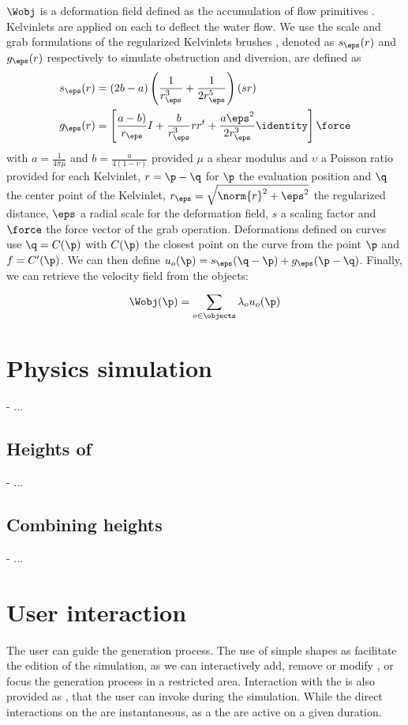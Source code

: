 $\Wobj$ is a deformation field defined as the accumulation of flow primitives \cite{Wejchert1991}. Kelvinlets are applied on each  to deflect the water flow. We use the scale and grab formulations of the regularized Kelvinlets brushes \cite{DeGoes2017}, denoted as $s_\eps(r)$ and $g_\eps(r)$ respectively to simulate obstruction and diversion, are defined as
\begin{align*}
    s_\eps(r) &= (2b - a) \left (\frac{1}{r_\eps^3} + \frac{1}{2r_\eps^5} \right)(s r) \\
    g_\eps(r) &= \left[ \frac{a - b)}{r_\eps}I + \frac{b}{r_\eps^3} r r^t + 
\frac{a \eps^2}{2 r_\eps^3} \identity \right] \force
\end{align*}
with $a = \frac{1}{4 \pi \mu}$ and $b = \frac{a}{4 (1 - \upsilon)}$ provided $\mu$ a shear modulus and $\upsilon$ a Poisson ratio provided for each Kelvinlet, $r = \p - \q$ for $\p$ the evaluation position and $\q$ the center point of the Kelvinlet, $r_\eps = \sqrt{\norm{r}^2 + \eps^2}$ the regularized distance, $\eps$ a radial scale for the deformation field, $s$ a scaling factor and $\force$ the force vector of the grab operation.
Deformations defined on curves use $\q = C(\p)$ with $C(\p)$ the closest point on the curve from the point $\p$ and $f = C'(\p)$. We can then define $u_o(\p) = s_\eps(\q - \p) + g_\eps(\p - \q)$.
Finally, we can retrieve the velocity field from the objects:
\begin{align*}
    \Wobj(\p) = \sum_{o \in \objects}^{}{\lambda_o u_o(\p)}
\end{align*}

\section{Physics simulation}
- ... 
\subsection{Heights of }
- ... 
\subsection{Combining heights}
- ... 

\section{User interaction}
\label{sec:semantic-representation_interaction}
The user can guide the generation process. The use of simple shapes as  facilitate the edition of the simulation, as we can interactively add, remove or modify , or focus the generation process in a restricted area. Interaction with the  is also provided as , that the user can invoke during the simulation. While the direct interactions on the  are instantaneous, as a the  are active on a given duration.


